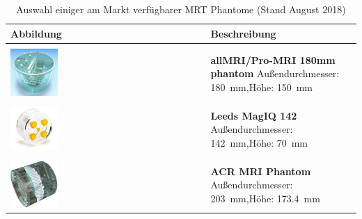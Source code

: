 \begin{table}[H]
	\caption[Kommerzielle MRT-Phantome]{Auswahl einiger am Markt verfügbarer MRT Phantome (Stand August 2018)}
	\centering
	\begin{tabularx}{\textwidth}{l X}
		\toprule
		\textbf{Abbildung} & \textbf{Beschreibung} \\
		\midrule \\[5pt]
		\includegraphics[width=0.25\textwidth,valign=t]{img/phantoms/allMRI.jpg} & \textbf{allMRI/\-Pro-MRI 180mm phantom} \newline Außendurchmesser: \SI{180}{\mm},\newline Höhe: \SI{150}{\mm} \newline \cite{allMRIphantom} \\
		&\\
		\includegraphics[width=0.25\textwidth,valign=t]{img/phantoms/MagIQ.jpg} & \textbf{Leeds MagIQ 142} \newline Außendurchmesser: \SI{142}{\mm},\newline Höhe: \SI{70}{\mm} \newline \cite{leeds} \\
		&\\
		\includegraphics[width=0.25\textwidth,valign=t]{img/phantoms/acr.jpg} & \textbf{ACR MRI Phantom} \newline Außendurchmesser: \SI{203}{\mm},\newline Höhe: \SI{173.4}{\mm} \newline \cite{acr} \\

\end{tabularx}
\end{table}
